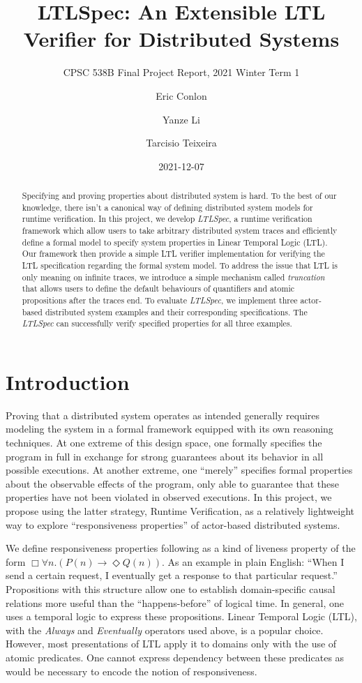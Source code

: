 \documentclass[format=acmsmall, nonacm=true, review=true]{acmart}
\title{LTLSpec: An Extensible LTL Verifier for Distributed Systems}
\subtitle{CPSC 538B Final Project Report, 2021 Winter Term 1}
\author{Eric Conlon}
\author{Yanze Li}
\author{Tarcisio Teixeira}
\date{2021-12-07}
\newcommand{\ltlspec}{\textit{LTLSpec}\xspace}
\begin{document}
\begin{abstract}
  Specifying and proving properties about distributed system is hard.
  To the best of our knowledge, there isn't a canonical way of defining distributed system models for runtime verification.
  In this project, we develop \ltlspec, a runtime verification framework which allow users to take arbitrary distributed system traces and efficiently define a formal model to specify system properties in Linear Temporal Logic (LTL).
  Our framework then provide a simple LTL verifier implementation for verifying the LTL specification regarding the formal system model.
  To address the issue that LTL is only meaning on infinite traces, we introduce a simple mechanism called \textit{truncation} that allows users to define the default behaviours of quantifiers and atomic propositions after the traces end.
  To evaluate \ltlspec, we implement three actor-based distributed system examples and their corresponding specifications. The \ltlspec can successfully verify specified properties for all three examples.
\end{abstract}

\maketitle

\section{Introduction}

Proving that a distributed system operates as intended generally requires modeling the system in a formal framework equipped with its own reasoning techniques.
At one extreme of this design space, one formally specifies the program in full in exchange for strong guarantees about its behavior in all possible executions.
At another extreme, one “merely” specifies formal properties about the observable effects of the program, only able to guarantee that these properties have not been violated in observed executions.
In this project, we propose using the latter strategy, Runtime Verification, as a relatively lightweight way to explore “responsiveness properties” of actor-based distributed systems.

We define responsiveness properties following \cite{actorservice,parthasarathy2018modular} as a kind of liveness property of the form \(\Box \forall n. (P(n) \rightarrow \Diamond Q(n))\).
As an example in plain English: “When I send a certain request, I eventually get a response to that particular request.” Propositions with this structure allow one to establish domain-specific causal relations more useful than the “happens-before” of logical time.
In general, one uses a temporal logic to express these propositions. Linear Temporal Logic (LTL), with the \textit{Always} and \textit{Eventually} operators used above, is a popular choice. However, most presentations of LTL apply it to domains only with the use of atomic predicates. One cannot express dependency between these predicates as would be necessary to encode the notion of responsiveness.
\end{document}
